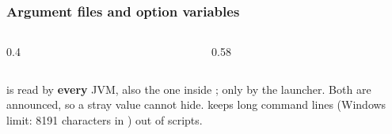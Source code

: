 \documentclass[aspectratio=169,10pt,compress]{beamer}
\begin{document}
\begin{frame}[t,fragile] \frametitle{Argument files and option variables}
  \begin{columns}[T]
    \begin{column}{0.4\textwidth}
    \end{column}
    \begin{column}{0.58\textwidth}
    \end{column}
  \end{columns}

  \vspace{0.1em}
  \small {} is read by \textbf{every} JVM, also the one inside ;
   only by the  launcher. Both are announced, so a stray value cannot hide.
   keeps long command lines (Windows limit: 8191 characters in ) out of scripts.
\end{frame}

\end{document}
